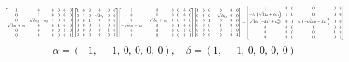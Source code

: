 \documentclass[11pt]{article}
\theoremstyle{definition}
\begin{document}
\[
\scaletoalign{\textwidth}{{\left[\begin{matrix}1 & 0 & 0 & 0 & 0 & 0\\0 & 1 & 0 & 0 & 0 & 0\\0 & \sqrt{d} u_{1} - u_{0} & 1 & 0 & 0 & 0\\\sqrt{d} u_{1} + u_{0} & 0 & 0 & 1 & 0 & 0\\0 & 0 & 0 & 0 & 1 & 0\\0 & 0 & 0 & 0 & 0 & 1\end{matrix}\right]} {\left[\begin{matrix}1 & 0 & 0 & 0 & 0 & 0\\0 & 1 & 0 & \sqrt{d} v_{0} & 0 & 0\\0 & 0 & 1 & 0 & 0 & 0\\0 & 0 & 0 & 1 & 0 & 0\\0 & 0 & 0 & 0 & 1 & 0\\0 & 0 & 0 & 0 & 0 & 1\end{matrix}\right]} {\left[\begin{matrix}1 & 0 & 0 & 0 & 0 & 0\\0 & 1 & 0 & 0 & 0 & 0\\0 & - \sqrt{d} u_{1} + u_{0} & 1 & 0 & 0 & 0\\- \sqrt{d} u_{1} - u_{0} & 0 & 0 & 1 & 0 & 0\\0 & 0 & 0 & 0 & 1 & 0\\0 & 0 & 0 & 0 & 0 & 1\end{matrix}\right]} {\left[\begin{matrix}1 & 0 & 0 & 0 & 0 & 0\\0 & 1 & 0 & - \sqrt{d} v_{0} & 0 & 0\\0 & 0 & 1 & 0 & 0 & 0\\0 & 0 & 0 & 1 & 0 & 0\\0 & 0 & 0 & 0 & 1 & 0\\0 & 0 & 0 & 0 & 0 & 1\end{matrix}\right]} = {\left[\begin{matrix}1 & 0 & 0 & 0 & 0 & 0\\- v_{0} \left(\sqrt{d} u_{0} + d u_{1}\right) & 1 & 0 & 0 & 0 & 0\\\sqrt{d} v_{0} \left(- d u_{1}^{2} + u_{0}^{2}\right) & 0 & 1 & v_{0} \left(- \sqrt{d} u_{0} + d u_{1}\right) & 0 & 0\\0 & 0 & 0 & 1 & 0 & 0\\0 & 0 & 0 & 0 & 1 & 0\\0 & 0 & 0 & 0 & 0 & 1\end{matrix}\right]}}
\]
\[
\alpha = \left( -1, \  -1, \  0, \  0, \  0, \  0\right), \quad \beta = \left( 1, \  -1, \  0, \  0, \  0, \  0\right)
\]
\end{document}
